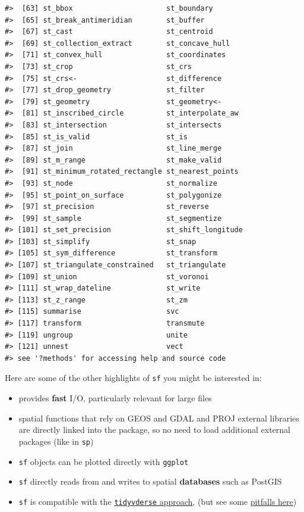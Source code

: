 \documentclass[
]{book}
\providecommand{\tightlist}{%
  \setlength{\itemsep}{0pt}\setlength{\parskip}{0pt}}
\begin{document}
\begin{verbatim}
#>  [63] st_bbox                      st_boundary                 
#>  [65] st_break_antimeridian        st_buffer                   
#>  [67] st_cast                      st_centroid                 
#>  [69] st_collection_extract        st_concave_hull             
#>  [71] st_convex_hull               st_coordinates              
#>  [73] st_crop                      st_crs                      
#>  [75] st_crs<-                     st_difference               
#>  [77] st_drop_geometry             st_filter                   
#>  [79] st_geometry                  st_geometry<-               
#>  [81] st_inscribed_circle          st_interpolate_aw           
#>  [83] st_intersection              st_intersects               
#>  [85] st_is_valid                  st_is                       
#>  [87] st_join                      st_line_merge               
#>  [89] st_m_range                   st_make_valid               
#>  [91] st_minimum_rotated_rectangle st_nearest_points           
#>  [93] st_node                      st_normalize                
#>  [95] st_point_on_surface          st_polygonize               
#>  [97] st_precision                 st_reverse                  
#>  [99] st_sample                    st_segmentize               
#> [101] st_set_precision             st_shift_longitude          
#> [103] st_simplify                  st_snap                     
#> [105] st_sym_difference            st_transform                
#> [107] st_triangulate_constrained   st_triangulate              
#> [109] st_union                     st_voronoi                  
#> [111] st_wrap_dateline             st_write                    
#> [113] st_z_range                   st_zm                       
#> [115] summarise                    svc                         
#> [117] transform                    transmute                   
#> [119] ungroup                      unite                       
#> [121] unnest                       vect                        
#> see '?methods' for accessing help and source code
\end{verbatim}

Here are some of the other highlights of \texttt{sf} you might be interested in:

\begin{itemize}
\tightlist
\item
  provides \textbf{fast} I/O, particularly relevant for large files
\item
  spatial functions that rely on GEOS and GDAL and PROJ external libraries are directly linked into the package, so no need to load additional external packages (like in \texttt{sp})
\item
  \texttt{sf} objects can be plotted directly with \texttt{ggplot}
\item
  \texttt{sf} directly reads from and writes to spatial \textbf{databases} such as PostGIS
\item
  \texttt{sf} is compatible with the \href{https://www.tidyverse.org/}{\texttt{tidyvderse} approach}, (but see some \href{https://geocompr.github.io/geocompkg/articles/tidyverse-pitfalls.html}{pitfalls here})
\end{itemize}
\end{document}
